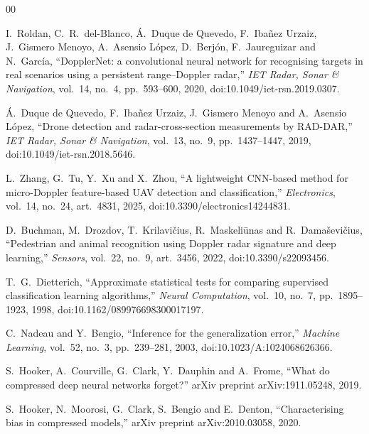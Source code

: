 \documentclass[conference]{IEEEtran}
\begin{document}
\begin{thebibliography}{00}

 I.~Roldan, C.~R.~del-Blanco, \'A.~Duque de Quevedo,
F.~Iba\~nez Urzaiz, J.~Gismero Menoyo, A.~Asensio L\'opez, D.~Berj\'on,
F.~Jaureguizar and N.~Garc\'ia, ``DopplerNet: a convolutional neural network
for recognising targets in real scenarios using a persistent range--Doppler
radar,'' \emph{IET Radar, Sonar \& Navigation}, vol.~14, no.~4, pp.~593--600,
2020, doi:10.1049/iet-rsn.2019.0307.

 \'A.~Duque de Quevedo, F.~Iba\~nez Urzaiz,
J.~Gismero Menoyo and A.~Asensio L\'opez, ``Drone detection and
radar-cross-section measurements by RAD-DAR,'' \emph{IET Radar, Sonar \&
Navigation}, vol.~13, no.~9, pp.~1437--1447, 2019,
doi:10.1049/iet-rsn.2018.5646.

 L.~Zhang, G.~Tu, Y.~Xu and X.~Zhou, ``A lightweight
CNN-based method for micro-Doppler feature-based UAV detection and
classification,'' \emph{Electronics}, vol.~14, no.~24, art.~4831, 2025,
doi:10.3390/electronics14244831.

 D.~Buchman, M.~Drozdov, T.~Krilavi\v{c}ius,
R.~Maskeli\=unas and R.~Dama\v{s}evi\v{c}ius, ``Pedestrian and animal
recognition using Doppler radar signature and deep learning,''
\emph{Sensors}, vol.~22, no.~9, art.~3456, 2022, doi:10.3390/s22093456.

 T.~G.~Dietterich, ``Approximate statistical tests
for comparing supervised classification learning algorithms,'' \emph{Neural
Computation}, vol.~10, no.~7, pp.~1895--1923, 1998,
doi:10.1162/089976698300017197.

 C.~Nadeau and Y.~Bengio, ``Inference for the
generalization error,'' \emph{Machine Learning}, vol.~52, no.~3,
pp.~239--281, 2003, doi:10.1023/A:1024068626366.

 S.~Hooker, A.~Courville, G.~Clark, Y.~Dauphin and
A.~Frome, ``What do compressed deep neural networks forget?'' arXiv preprint
arXiv:1911.05248, 2019.

 S.~Hooker, N.~Moorosi, G.~Clark, S.~Bengio and
E.~Denton, ``Characterising bias in compressed models,'' arXiv preprint
arXiv:2010.03058, 2020.

\end{thebibliography}
\end{document}
